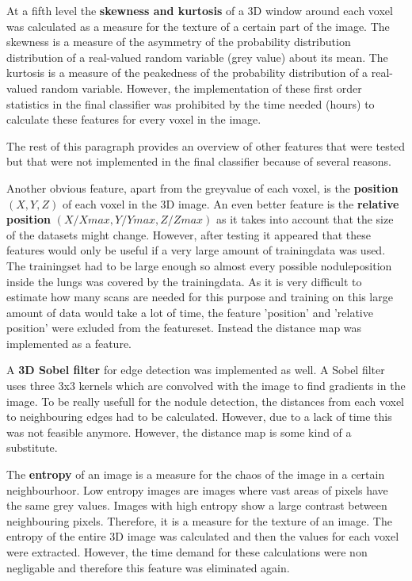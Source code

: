 At a fifth level the \textbf{skewness and kurtosis} of a 3D window around each
voxel was calculated as a measure for the texture of a certain part of the image. The
skewness is a measure of the asymmetry of the probability distribution
distribution of a real-valued random variable (grey value) about its mean. The
kurtosis is a measure of the peakedness of the probability distribution of a
real-valued random variable. However, the implementation of these first order
statistics in the final classifier was prohibited by the time needed (hours) to
calculate these features for every voxel in the image.

The rest of this paragraph provides an overview of other features that were
tested but that were not implemented in the final classifier because of several
reasons.

Another obvious feature, apart from the greyvalue of each voxel, is the
\textbf{position} $(X, Y, Z)$ of each voxel in the 3D image. An even better
feature is the \textbf{relative position} $(X/Xmax, Y/Ymax, Z/Zmax)$ as it takes
into account that the size of the datasets might change. However, after testing it appeared that
these features would only be useful if a very large amount of trainingdata was
used. The trainingset had to be large enough so almost every possible
noduleposition inside the lungs was covered by the trainingdata. As it is very
difficult to estimate how many scans are needed for this purpose and training
on this large amount of data would take a lot of time, the feature 'position'
and 'relative position' were exluded from the featureset. Instead the distance
map was implemented as a feature.

A \textbf{3D Sobel filter} for edge detection was implemented as well. A Sobel
filter uses three 3x3 kernels which are convolved with the image to find
gradients in the image. To be really usefull for the nodule detection, the
distances from each voxel to neighbouring edges had to be calculated. However,
due to a lack of time this was not feasible anymore. However, the
distance map is some kind of a substitute.

The \textbf{entropy} of an image is a measure for the chaos of the image
in a certain neighbourhoor. Low
entropy images are images where vast areas of pixels have the same grey
values. Images with high entropy show a large contrast between neighbouring
pixels. Therefore, it is a measure for the texture of an image. The entropy of
the entire 3D image was calculated and then the values for each voxel were
extracted. However, the time demand for these calculations were non negligable
and therefore this feature was eliminated again.

